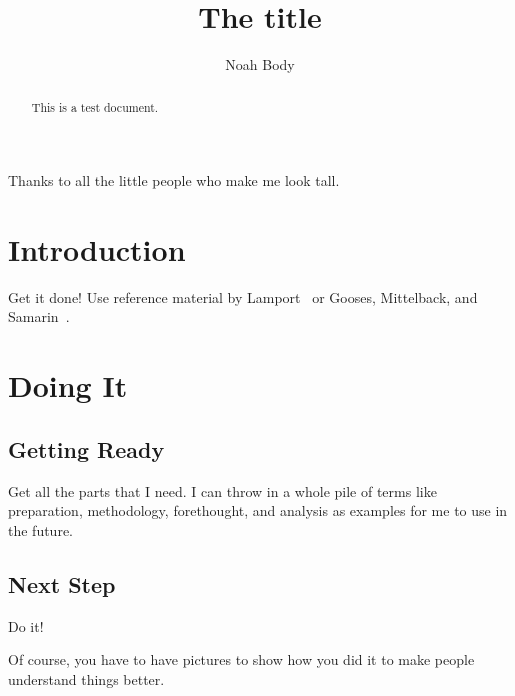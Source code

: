 \documentclass[12pt]{dalcsthesis}
\begin{document}
\mcs  %
\title{The title}
\author{Noah Body}



\nolistoftables
\nolistoffigures

\frontmatter

\begin{abstract}
This is a test document.
\end{abstract}

\begin{acknowledgements}
Thanks to all the little people who make me look tall.
\end{acknowledgements}

\mainmatter

\chapter{Introduction}

Get it done!  Use reference material by Lamport~\cite{latex-by-lamport} or
Gooses, Mittelback, and Samarin~\cite{latex-companion}.

\chapter{Doing It}

\section{Getting Ready}

Get all the parts that I need.  I can throw in a whole pile of terms like
preparation,
methodology,
forethought,
and
analysis
as examples for me to use in the future.

\section{Next Step}

Do it!

Of course, you have to have pictures to show how you did it to make people
understand things better.
\end{document}
